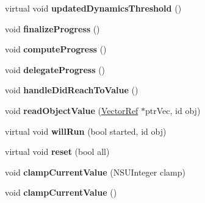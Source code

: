 \begin{DoxyCompactItemize}
virtual void {\bfseries updated\+Dynamics\+Threshold} ()
\item 
\mbox{\label{struct___p_o_p_property_animation_state_ae09532bb611aa41153b5f582f17e6924}} 
void {\bfseries finalize\+Progress} ()
\item 
\mbox{\label{struct___p_o_p_property_animation_state_a15d1ddd5527abe19551d23bc77af74d3}} 
void {\bfseries compute\+Progress} ()
\item 
\mbox{\label{struct___p_o_p_property_animation_state_aaa73ffe40b5d907917915c1970ecd767}} 
void {\bfseries delegate\+Progress} ()
\item 
\mbox{\label{struct___p_o_p_property_animation_state_a945113ce3f4b94b199ba5bf8564e6ee3}} 
void {\bfseries handle\+Did\+Reach\+To\+Value} ()
\item 
\mbox{\label{struct___p_o_p_property_animation_state_aefaf4a1c55b5c0999987782b7b664d93}} 
void {\bfseries read\+Object\+Value} (\mbox{\hyperlink{namespace_p_o_p_ae9f6819a2172ed569526091e357712f5}{Vector\+Ref}} $\ast$ptr\+Vec, id obj)
\item 
\mbox{\label{struct___p_o_p_property_animation_state_aaaf8929284af57006cec636392e162a5}} 
virtual void {\bfseries will\+Run} (bool started, id obj)
\item 
\mbox{\label{struct___p_o_p_property_animation_state_a59824588af2468000ebbdd7f3365468b}} 
virtual void {\bfseries reset} (bool all)
\item 
\mbox{\label{struct___p_o_p_property_animation_state_aeedbe5578dbe7140b6dc94e2ed45e5c1}} 
void {\bfseries clamp\+Current\+Value} (N\+S\+U\+Integer clamp)
\item 
\mbox{\label{struct___p_o_p_property_animation_state_a8c121da1b918e46629befee66c3b104b}} 
void {\bfseries clamp\+Current\+Value} ()
\item 

\end{DoxyCompactItemize}
